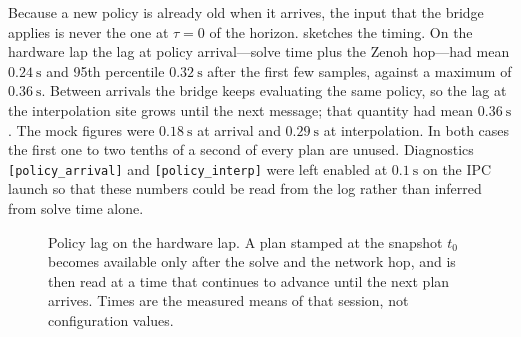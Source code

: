 Because a new policy is already old when it arrives, the input that the
bridge applies is never the one at $\tau=0$ of the horizon.
 sketches the timing. On the hardware lap the lag at
policy arrival---solve time plus the Zenoh hop---had mean
$\qty{0.24}{\second}$ and 95th percentile $\qty{0.32}{\second}$ after
the first few samples, against a maximum of $\qty{0.36}{\second}$.
Between arrivals the bridge keeps evaluating the same policy, so the lag
at the interpolation site grows until the next message; that quantity
had mean $\qty{0.36}{\second}$. The mock figures were
$\qty{0.18}{\second}$ at arrival and $\qty{0.29}{\second}$ at
interpolation. In both cases the first one to two tenths of a second of
every plan are unused. Diagnostics
\texttt{[policy\_arrival]} and \texttt{[policy\_interp]} were left
enabled at $\qty{0.1}{\second}$ on the IPC launch so that these numbers
could be read from the log rather than inferred from solve time alone.

\begin{figure}[htbp]
  \centering
  \caption[Policy lag on the hardware lap]{%
    Policy lag on the hardware lap. A plan stamped at the snapshot
    $t_0$ becomes available only after the solve and the network hop,
    and is then read at a time that continues to advance until the next
    plan arrives. Times are the measured means of that session, not
    configuration values.}
  \label{fig:hw-lag}
\end{figure}

